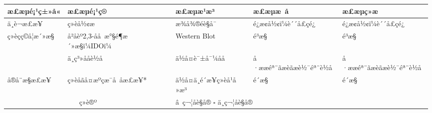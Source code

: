 \documentclass[UTF8,10pt,a4paper,fontset=fandol]{ctexart}
\newcommand{\fieldvalue}[1]{#1}
\newcommand{\handwritten}[1]{#1}
\begin{document}
\small
\begin{tabularx}{\textwidth}{|p{2.1cm}|p{2.5cm}|X|X|X|}
\hline
æ£æµé¡¹ç±»å« & æ£æµé¡¹ç® & æ£æµæ¹æ³ & æ£æµæ å & æ£æµç»æ
\\ \hline
ä¸è¬æ£æ¥ &
\fieldvalue{ç»èå½¢æ}
&
\fieldvalue{æ¾å¾®éè§å¯}
&
\fieldvalue{é¿æ¢­å½¢ï¼è´´å£çé¿}
&
\fieldvalue{é¿æ¢­å½¢ï¼è´´å£çé¿}
\\ \hline
\multirow{2}{*}{ç»èçç©å­¦æ´»æ§}
&
\fieldvalue{å²åèº2,3-åå æ°§é¶æ´»æ§ï¼IDOï¼}
&
\fieldvalue{Western Blot}
&
\fieldvalue{é³æ§}
&
\fieldvalue{é³æ§}
\\ \cline{2-5}
&
\fieldvalue{ä¸ç³»ååè½å}
&
\fieldvalue{ä½å¤è¯±å¯¼åå}
&
\fieldvalue{å·ææéª¨ãæèãæè½¯éª¨è½å}
&
\fieldvalue{å·ææéª¨ãæèãæè½¯éª¨è½å}
\\ \hline
å®å¨æ§æ£æ¥ &
\fieldvalue{ç»èåãå¤æºçæ¯å å­æ£æ¥*}
&
\fieldvalue{ä½å¤ä¸é´æ¥ç»èå¹å»æ³}
&
\fieldvalue{é´æ§}
&
\fieldvalue{é´æ§}
\\ \hline
\multicolumn{2}{|c|}{ç»è®º}
&
\multicolumn{3}{l|}{
\fieldvalue{\handwritten{â\ ç¬¦åè§å®}}
\quad $\square$ ä¸ç¬¦åè§å®
}
\\ \hline
\end{tabularx}
\normalsize
\end{document}
